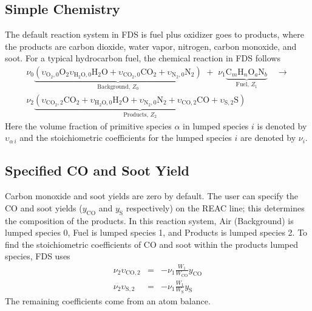 \subsection{Simple Chemistry}

The default reaction system in FDS is fuel plus oxidizer goes to products, where the products are carbon dioxide, water vapor, nitrogen, carbon monoxide, and soot. For a typical hydrocarbon fuel, the chemical reaction in FDS follows
\begin{multline}\label{eq:full_lump}
\nu_{0}\underbrace{(\upsilon_{\mathrm{O}_{2},0}\mathrm{O}_2 \upsilon_{\mathrm{H}_{2}\mathrm{O},0}\mathrm{H}_2\mathrm{O}+\upsilon_{\mathrm{CO}_{2},0}\mathrm{CO}_2+\upsilon_{\mathrm{N}_{2},0}\mathrm{N}_2)}_\text{Background,~$Z_0$} \,\,+ \,\, \nu_{1}\underbrace{\mbox{C}_m\mbox{H}_n\mbox{O}_a\mbox{N}_b}_\text{Fuel,~$Z_1$} \quad \longrightarrow \\
\nu_{2}\underbrace{(\upsilon_{\mathrm{CO}_{2},2}\mathrm{CO}_2+\upsilon_{\mathrm{H}_{2}\mathrm{O},0}\mathrm{H}_2\mathrm{O}+\upsilon_{\mathrm{N}_{2},0}\mathrm{N}_2+\upsilon_{\mathrm{CO},2}\mathrm{CO}+\upsilon_{\mathrm{S},2}\mathrm{S})}_\text{Products,~$Z_2$}
\end{multline}
Here the volume fraction of primitive species $\alpha$ in lumped species $i$ is denoted by $\upsilon_{\alpha\,i}$ and the stoichiometric coefficients for the lumped species $i$ are denoted by $\nu_{i}$.

\subsection{Specified CO and Soot Yield}

Carbon monoxide and soot yields are zero by default. The user can specify the CO and soot yields ($y_{\mathrm{CO}}$ and $y_{\mathrm{S}}$ respectively) on the {\ct REAC} line; this determines the composition of the products. In this reaction system, Air (Background) is lumped species 0, Fuel is lumped species 1, and Products is lumped species 2. To find the stoichiometric coefficients of CO and soot within the products lumped species, FDS uses
\begin{eqnarray}\label{eq:yields}
\nu_{2}\upsilon_{\mathrm{CO},2}&=&-\nu_{1}\frac{W_1}{W_{\mathrm{CO}}}y_{\mathrm{CO}} \\
\nu_{2}\upsilon_{\mathrm{S},2}&=&-\nu_{1}\frac{W_1}{W_{\mathrm{S}}}y_{\mathrm{S}}
\end{eqnarray}
The remaining coefficients come from an atom balance.


